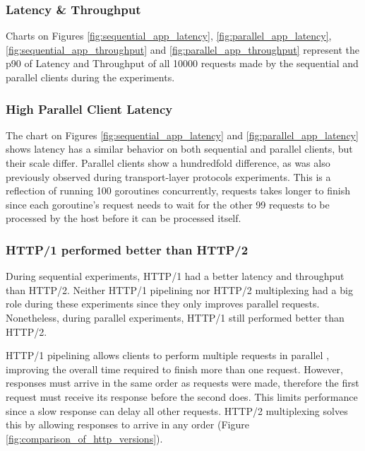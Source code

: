 \subsubsection{Latency \& Throughput}

Charts on Figures \ref{fig:sequential_app_latency}, \ref{fig:parallel_app_latency}, \ref{fig:sequential_app_throughput} and \ref{fig:parallel_app_throughput} represent the \gls{p90} of Latency and Throughput of all 10000 requests made by the sequential and parallel clients during the experiments.

\subsubsection*{High Parallel Client Latency}

The chart on Figures \ref{fig:sequential_app_latency} and \ref{fig:parallel_app_latency} shows latency has a similar behavior on both sequential and parallel clients, but their scale differ. Parallel clients show a hundredfold difference, as was also previously observed during transport-layer protocols experiments. This is a reflection of running 100 goroutines concurrently, requests takes longer to finish since each goroutine's request needs to wait for the other 99 requests to be processed by the host before it can be processed itself.

\subsubsection*{HTTP/1 performed better than HTTP/2}

During sequential experiments, HTTP/1 had a better latency and throughput than HTTP/2. Neither HTTP/1 pipelining nor HTTP/2 multiplexing had a big role during these experiments since they only improves parallel requests. Nonetheless, during parallel experiments, HTTP/1 still performed better than HTTP/2.

HTTP/1 pipelining allows clients to perform multiple requests in parallel \cite{rfc2616}, improving the overall time required to finish more than one request. However, responses must arrive in the same order as requests were made, therefore the first request must receive its response before the second does. This limits performance since a slow response can delay all other requests. HTTP/2 multiplexing solves this by allowing responses to arrive in any order (Figure \ref{fig:comparison_of_http_versions}).

